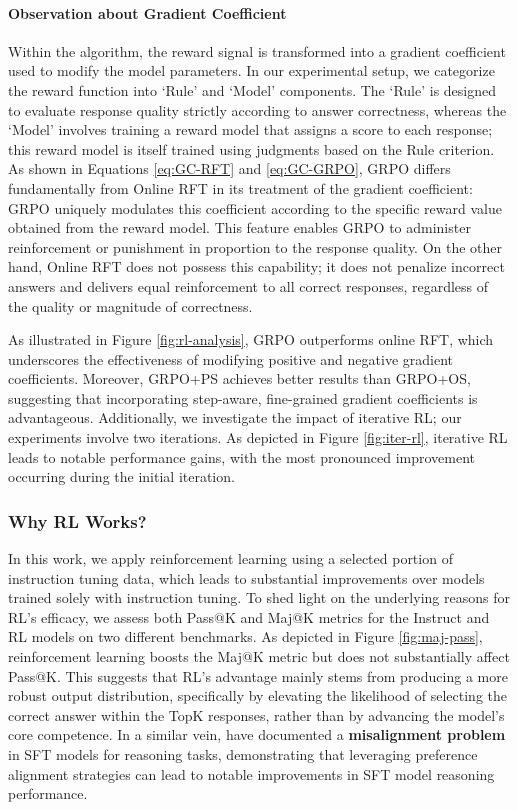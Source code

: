 \begin{itemize}[topsep=0pt]
\begin{itemize}[topsep=0pt]
\paragraph{Observation about Gradient Coefficient} Within the algorithm, the reward signal is transformed into a gradient coefficient used to modify the model parameters. In our experimental setup, we categorize the reward function into `Rule' and `Model' components. The `Rule' is designed to evaluate response quality strictly according to answer correctness, whereas the `Model' involves training a reward model that assigns a score to each response; this reward model is itself trained using judgments based on the Rule criterion. As shown in Equations \ref{eq:GC-RFT} and \ref{eq:GC-GRPO}, GRPO differs fundamentally from Online RFT in its treatment of the gradient coefficient: GRPO uniquely modulates this coefficient according to the specific reward value obtained from the reward model. This feature enables GRPO to administer reinforcement or punishment in proportion to the response quality. On the other hand, Online RFT does not possess this capability; it does not penalize incorrect answers and delivers equal reinforcement to all correct responses, regardless of the quality or magnitude of correctness.

As illustrated in Figure \ref{fig:rl-analysis}, GRPO outperforms online RFT, which underscores the effectiveness of modifying positive and negative gradient coefficients. Moreover, GRPO+PS achieves better results than GRPO+OS, suggesting that incorporating step-aware, fine-grained gradient coefficients is advantageous. Additionally, we investigate the impact of iterative RL; our experiments involve two iterations. As depicted in Figure \ref{fig:iter-rl}, iterative RL leads to notable performance gains, with the most pronounced improvement occurring during the initial iteration.

\subsubsection{Why RL Works?} In this work, we apply reinforcement learning using a selected portion of instruction tuning data, which leads to substantial improvements over models trained solely with instruction tuning. To shed light on the underlying reasons for RL’s efficacy, we assess both Pass@K and Maj@K metrics for the Instruct and RL models on two different benchmarks. As depicted in Figure \ref{fig:maj-pass}, reinforcement learning boosts the Maj@K metric but does not substantially affect Pass@K. This suggests that RL’s advantage mainly stems from producing a more robust output distribution, specifically by elevating the likelihood of selecting the correct answer within the TopK responses, rather than by advancing the model’s core competence. In a similar vein, \citep{wang2023making} have documented a \textbf{misalignment problem} in SFT models for reasoning tasks, demonstrating that leveraging preference alignment strategies \citep{yuan2023rrhf,song2023preference,wang2023making} can lead to notable improvements in SFT model reasoning performance.


\end{itemize}
\end{itemize}
